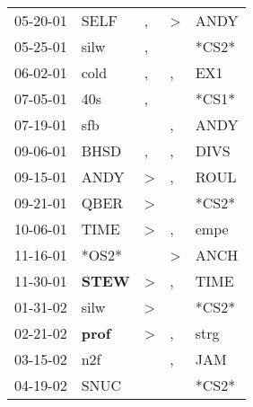 \begin{supertabular}{p{0.07\textwidth}p{0.06\textwidth}p{0.02\textwidth}p{0.02\textwidth}p{0.06\textwidth}}
 05-20-01\textsuperscript{} &           SELF\textsuperscript{} &                , &     \textgreater &           ANDY\textsuperscript{} \\
 05-25-01\textsuperscript{} &           silw\textsuperscript{} &                , &                  &                            *CS2* \\
 06-02-01\textsuperscript{} &           cold\textsuperscript{} &                , &                , &            EX1\textsuperscript{} \\
 07-05-01\textsuperscript{} &            40s\textsuperscript{} &                , &                  &                            *CS1* \\
 07-19-01\textsuperscript{} &            sfb\textsuperscript{} &                  &                , &           ANDY\textsuperscript{} \\
 09-06-01\textsuperscript{} &           BHSD\textsuperscript{} &                , &                , &           DIVS\textsuperscript{} \\
 09-15-01\textsuperscript{} &           ANDY\textsuperscript{} &     \textgreater &                , &           ROUL\textsuperscript{} \\
 09-21-01\textsuperscript{} &           QBER\textsuperscript{} &     \textgreater &                  &                            *CS2* \\
 10-06-01\textsuperscript{} &           TIME\textsuperscript{} &     \textgreater &                , &           empe\textsuperscript{} \\
 11-16-01\textsuperscript{} &                            *OS2* &                  &     \textgreater &           ANCH\textsuperscript{} \\
 11-30-01\textsuperscript{} &  \textbf{STEW\textsuperscript{}} &     \textgreater &                , &           TIME\textsuperscript{} \\
 01-31-02\textsuperscript{} &           silw\textsuperscript{} &     \textgreater &                  &                            *CS2* \\
 02-21-02\textsuperscript{} &  \textbf{prof\textsuperscript{}} &     \textgreater &                , &           strg\textsuperscript{} \\
 03-15-02\textsuperscript{} &            n2f\textsuperscript{} &                  &                , &            JAM\textsuperscript{} \\
 04-19-02\textsuperscript{} &           SNUC\textsuperscript{} &                  &                  &                            *CS2* \\

\end{supertabular}
